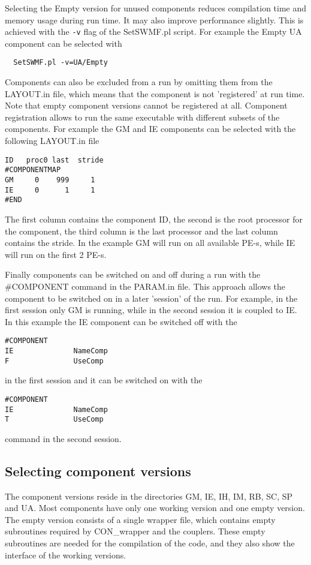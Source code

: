 Selecting the Empty version for unused components reduces
compilation time and memory usage during run time.
It may also improve performance slightly.
This is achieved with the {\tt -v} flag of the SetSWMF.pl script. 
For example the Empty UA component can be selected with
\begin{verbatim}
  SetSWMF.pl -v=UA/Empty
\end{verbatim}
Components can also be excluded from a run by omitting them from the LAYOUT.in 
file, which means that the component is not 'registered' at run time.
Note that empty component versions cannot be registered at all.
Component registration allows to run the same executable with different 
subsets of the components. For example the GM and IE components 
can be selected with the following LAYOUT.in file
\begin{verbatim}
ID   proc0 last  stride
#COMPONENTMAP
GM     0    999     1
IE     0      1     1
#END
\end{verbatim}
The first column contains the component ID, the second is the
root processor for the component, the third column is the
last processor and the last column contains the stride.
In the example GM will run on all available PE-s, while IE
will run on the first 2 PE-s. 

Finally components can be switched on and off during a run
with the \#COMPONENT command in the PARAM.in file. 
This approach allows the component to be switched on in a later 
'session' of the run. For example, in the first session only GM 
is running, while in the second session it is coupled to IE. 
In this example the IE component can be switched off with the
\begin{verbatim}
#COMPONENT
IE              NameComp
F               UseComp
\end{verbatim}
in the first session and it can be switched on with the
\begin{verbatim}
#COMPONENT
IE              NameComp
T               UseComp
\end{verbatim}
command in the second session.

\subsection{Selecting component versions}

The component versions reside in the directories GM, IE, IH, IM, RB, SC,
SP and UA.
Most components have only one working version and one empty version.
The empty version consists of a single wrapper file, which contains 
empty subroutines required by CON\_wrapper and the couplers.
These empty subroutines are needed for the compilation of the code,
and they also show the interface of the working versions.

